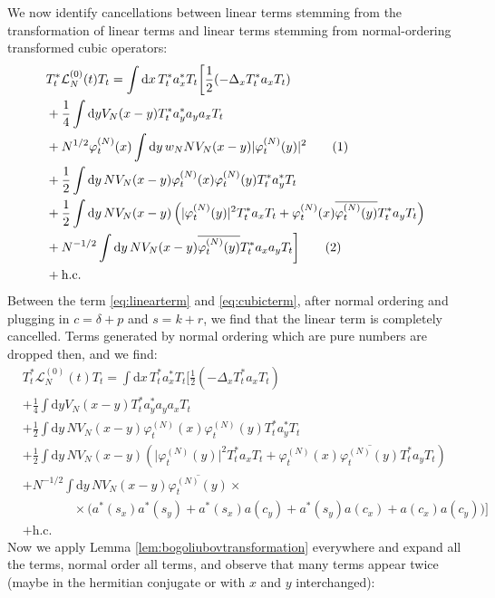 \documentclass[11pt,a4paper,twoside,headsepline]{scrartcl}
\newcommand{\di}{\textrm{d}}		%
\newcommand{\Lcal}{\mathcal{L}}		%
\newcommand{\hc}{\mbox{h.c.}}		%
\newcommand{\cc}[1]{\overline{#1}}	%
\newcommand{\ph}{\varphi_t^{(N)}}	%
\newcommand{\tagg}[1]{ \stepcounter{equation} \tag{\theequation} \label{eq:#1} } %
\newcommand{\eqr}[1]{\eqref{eq:#1}}			%
\begin{document}
We now identify cancellations between linear terms stemming from the transformation of linear terms and linear terms stemming from normal-ordering transformed cubic operators:
\begin{align*}
& T^*_t \Lcal^{(0)}_N(t) T_t = \int \di x\, T^*_t a^*_x T_t \bigg[   \frac{1}{2}(-\Delta_x T^*_t a_x T_t) \\
& + \frac{1}{4}\int \di y V_N(x-y) T^*_t a^*_y a_y a_x T_t \\
& + N^{1/2} \ph(x) \int \di y\, w_N N V_N(x-y) \lvert \ph(y) \rvert^2 \tagg{linearterm} \\
& + \frac{1}{2} \int \di y\, NV_N(x-y)  \ph(x) \ph(y)  T^*_t a^*_y T_t \\
& + \frac{1}{2} \int \di y\, NV_N(x-y) \left(  \lvert \ph(y)\rvert^2 T^*_t a_x T_t + \ph(x) \cc{\ph(y)} T^*_t a_y T_t  \right) \\
& + N^{-1/2} \int \di y\, NV_N(x-y) \cc{\ph(y)} T^*_t a_x a_y T_t  \bigg]\tagg{cubicterm} \\
& + \hc
\end{align*}
Between the term \eqr{linearterm} and \eqr{cubicterm}, after normal ordering and plugging in $c = \delta + p$ and $s = k + r$, we find that the linear term is completely cancelled. Terms generated by normal ordering which are pure numbers are dropped then, and we find:
\begin{align*}
& T^*_t \Lcal^{(0)}_N(t) T_t = \int \di x\, T^*_t a^*_x T_t \bigg[   \frac{1}{2}(-\Delta_x T^*_t a_x T_t) \\
& + \frac{1}{4}\int \di y V_N(x-y) T^*_t a^*_y a_y a_x T_t \\
& + \frac{1}{2} \int \di y\, NV_N(x-y)  \ph(x) \ph(y)  T^*_t a^*_y T_t \\
& + \frac{1}{2} \int \di y\, NV_N(x-y) \left(  \lvert \ph(y)\rvert^2 T^*_t a_x T_t + \ph(x) \cc{\ph(y)} T^*_t a_y T_t  \right) \\
& + N^{-1/2} \int \di y\, NV_N(x-y) \cc{\ph(y)} \times \\
& \qquad\qquad  \times \bigg(  a^*(s_x) a^*(s_y) + a^*(s_x) a(c_y)  + a^*(s_y) a(c_x) + a(c_x) a(c_y)  \bigg)  \bigg] \\
& + \hc
\end{align*}
Now we apply Lemma \ref{lem:bogoliubovtransformation} everywhere and expand all the terms, normal order all terms, and observe that many terms appear twice (maybe in the hermitian conjugate or with $x$ and $y$ interchanged):
\end{document}
